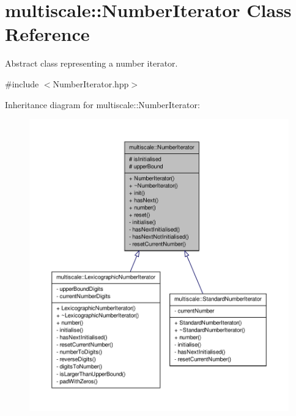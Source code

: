 \hypertarget{classmultiscale_1_1NumberIterator}{\section{multiscale\-:\-:\-Number\-Iterator \-Class \-Reference}
\label{classmultiscale_1_1NumberIterator}
}


\-Abstract class representing a number iterator.  




{\ttfamily \#include $<$\-Number\-Iterator.\-hpp$>$}



\-Inheritance diagram for multiscale\-:\-:\-Number\-Iterator\-:
\nopagebreak
\begin{figure}[H]
\begin{center}
\leavevmode
\includegraphics[width=350pt]{classmultiscale_1_1NumberIterator__inherit__graph}
\end{center}
\end{figure}
